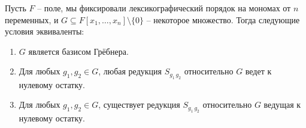 \begin{claim}
Пусть $F$ -- поле, мы фиксировали лексикографический порядок на мономах от $n$ переменных, и $G\subseteq F[x_1,\ldots,x_n]\setminus\{0\}$ -- некоторое множество.
Тогда следующие условия эквиваленты:
\begin{enumerate}
\item $G$ является базисом Грёбнера.

\item Для любых $g_1,g_2\in G$, любая редукция $S_{g_1\,g_2}$ относительно $G$ ведет к нулевому остатку.

\item Для любых $g_1,g_2\in G$, существует редукция $S_{g_1\,g_2}$ относительно $G$ ведущая к нулевому остатку.
\end{enumerate}
\end{claim}
